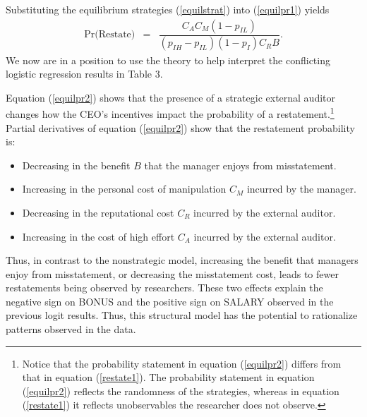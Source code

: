 Substituting the equilibrium strategies (\ref{equilstrat}) into (\ref{equilpr1}) yields
\begin{equation} \label{equilpr2}
\begin{array}{lcl}
\mbox{Pr(Restate)}& = &  \dfrac{C_AC_M(1-p_{IL})}{(p_{IH}-p_{IL})(1-p_I)C_RB}.
\end{array}\end{equation}
We now are in a position to use the theory to help interpret the conflicting logistic regression results
in Table 3. 

 
Equation (\ref{equilpr2}) shows that the presence of a strategic external auditor
changes how the CEO's incentives impact the probability of a restatement.\footnote{Notice that
the probability statement in equation  (\ref{equilpr2})  differs from that in equation (\ref{restate1}).
The probability statement in equation  (\ref{equilpr2}) reflects the randomness of the
strategies, whereas in equation (\ref{restate1}) it reflects unobservables the researcher 
does not observe.} Partial derivatives of equation (\ref{equilpr2}) show that the restatement probability is:\\

\begin{itemize}
\item Decreasing in the benefit $B$ that the manager enjoys from misstatement.
\item Increasing in the personal cost of manipulation $C_M$ incurred by the manager.
\item Decreasing in the reputational cost $C_R$ incurred by the external auditor.
\item Increasing in the cost of high effort $C_A$ incurred by the external auditor.
\end{itemize}

Thus, in contrast to the nonstrategic model, increasing the benefit that managers enjoy from misstatement,
or decreasing the misstatement cost, leads to fewer restatements being observed by researchers.
These two effects explain the negative sign on BONUS and the positive sign on SALARY observed in the previous logit results. Thus, this structural model has the potential to rationalize patterns observed in the data.

